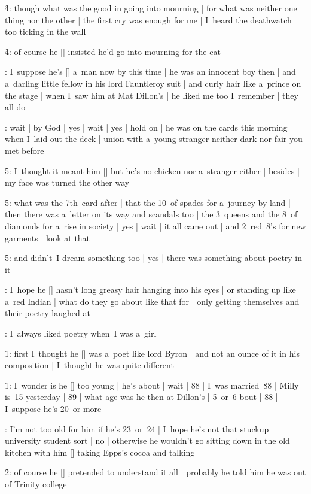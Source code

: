 \f4:
though what was the good in going into mourning |
for what was neither one thing nor the other |
the first cry was enough for me |
I~heard the deathwatch too ticking in the wall

\f4:
of course he [\bloom] insisted he'd go into mourning for the cat

:
I~suppose he's [\stephen] a~man now by this time |
he was an innocent boy then |
and a~darling little fellow in his lord Fauntleroy suit |
and curly hair like a~prince on the stage |
when I~saw him at Mat Dillon's |
he liked me too I~remember |
they all do

:
wait |
by God |
yes |
wait |
yes |
hold on |
he was on the cards this morning when I~laid out the deck |
union with a~young stranger neither dark nor fair you met before

\f5:
I~thought it meant him [\boylan] but he's no chicken nor a~stranger either |
besides |
my face was turned the other way

\f5:
what was the 7th~card after |
that the 10~of spades for a~journey by land |
then there was a~letter on its way and scandals too |
the 3~queens and the 8~of diamonds for a~rise in society |
yes |
wait |
it all came out |
and 2~red~8's for new garments |
look at that

\f5:
and didn't~I dream something too |
yes |
there was something about poetry in it

:
I~hope he [\stephen] hasn't long greasy hair hanging into his eyes |
or standing up like a~red Indian |
what do they go about like that for |
only getting themselves and their poetry laughed at

:
I~always liked poetry when~I was a~girl

\f1:
first I~thought he [\bloom] was a~poet like lord Byron |
and not an ounce of it in his composition |
I~thought he was quite different

\f1:
I~wonder is he [\stephen] too young |
he's about |
wait |
88 |
I~was married~88 |
Milly is~15 yesterday |
89 |
what age was he then at Dillon's |
5~or~6 bout |
88 |
I~suppose he's 20~or more

:
I'm not too old for him if he's 23~or~24 |
I~hope he's not that stuckup university student sort |
no |
otherwise he wouldn't go sitting down
in the old kitchen with him [\bloom] taking Epps's cocoa
and talking

\f2:
of course he [\bloom] pretended to understand it all |
probably he told him he was out of Trinity college

